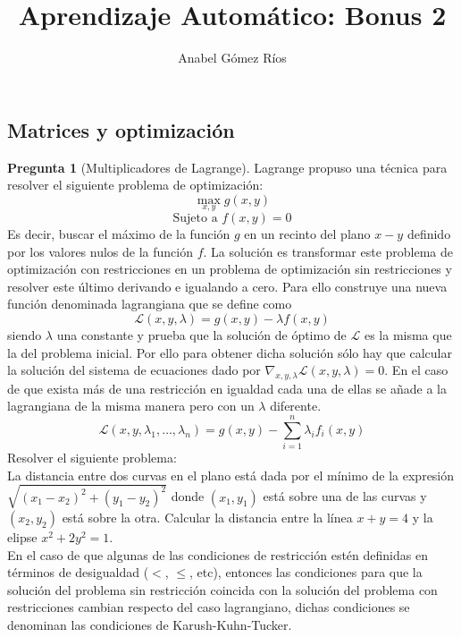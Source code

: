 \documentclass[12pt]{article}
\title{Aprendizaje Automático: Bonus 2}
\author{Anabel G\'omez R\'ios}
\theoremstyle{definition}
\begin{document}
\maketitle

\newtheorem{pregunta}{Pregunta}

\subsection{Matrices y optimización}
\begin{pregunta}[Multiplicadores de Lagrange]
Lagrange propuso una técnica para resolver el siguiente problema de optimización:
    \[ \max_{x,y} g(x,y) \]
    \[ \text{Sujeto a } f(x,y)=0 \]
    Es decir, buscar el máximo de la función $g$ en un recinto del plano $x-y$ definido por los valores nulos de la función $f$. La solución es transformar este problema de optimización con restricciones en un problema de optimización sin restricciones y resolver este último derivando e igualando a cero. Para ello construye una nueva función denominada lagrangiana que se define como
    \[
    \mathcal{L}(x,y,\lambda)=g(x,y)-\lambda f(x,y)
    \]
    siendo $\lambda$ una constante y prueba que la solución de óptimo de $\mathcal{L}$ es la misma que la del problema inicial. Por ello para obtener dicha solución sólo hay que calcular la solución del sistema de ecuaciones dado por $\nabla_{x,y,\lambda}\mathcal{L}(x,y,\lambda)=0$. En el caso de que exista más de una restricción en igualdad cada una de ellas se añade a la lagrangiana de la misma manera pero con un $\lambda$ diferente.
    \[
    \mathcal{L}(x,y,\lambda_1,\dots,\lambda_n)=
    			g(x,y)-\sum_{i=1}^n \lambda_i f_i(x,y)
    \]
    Resolver el siguiente problema:\\
    La distancia entre dos curvas en el plano está dada por el mínimo de la expresión $\sqrt{(x_1-x_2)^2+(y_1-y_2)^2}$ donde $(x_1,y_1)$ está sobre una de las curvas y $(x_2,y_2)$ está sobre la otra. Calcular la distancia entre la línea $x+y=4$ y la elipse $x^2+2y^2=1$.\\
    
    En el caso de que algunas de las condiciones de restricción estén definidas en términos de desigualdad ($<$, $ \leq$, etc), entonces las condiciones para que la solución del problema sin restricción coincida con la solución del problema con restricciones cambian respecto del caso lagrangiano, dichas condiciones se denominan las condiciones de \textrm{Karush-Kuhn-Tucker}.\\
\textit{ }\\
    

\end{pregunta}
\end{document}
